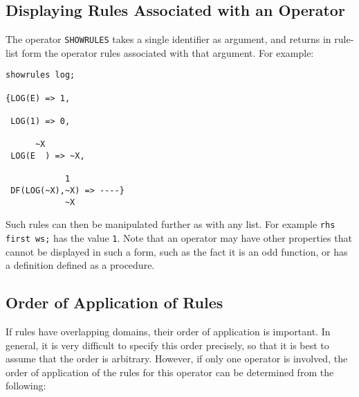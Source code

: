 \subsection*{Displaying Rules Associated with an Operator}

The operator {\tt SHOWRULES} takes a single identifier
as argument, and returns in rule-list form the operator rules associated
with that argument.  For example:
\begin{verbatim}
showrules log;

{LOG(E) => 1,

 LOG(1) => 0,

      ~X
 LOG(E  ) => ~X,

		    1
 DF(LOG(~X),~X) => ----}
		    ~X
\end{verbatim}

Such rules can then be manipulated further as with any list.  For example
{\tt rhs first ws;} has the value {\tt 1}.  Note that an operator may
have other properties that cannot be displayed in such a form, such as the
fact it is an odd function, or has a definition defined as a procedure.

\subsection*{Order of Application of Rules}

If rules have overlapping domains, their order of application is
important.  In general, it is very difficult to specify this order
precisely, so that it is best to assume that the order is arbitrary.
However, if only one operator is involved, the order of application of the
rules for this operator can be determined from the following:

